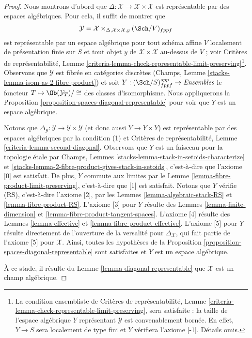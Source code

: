 \begin{proof}
Nous montrons d'abord que $\Delta : \mathcal{X} \to \mathcal{X} \times \mathcal{X}$
est représentable par des espaces algébriques. Pour cela, il suffit de montrer
que
$$
\mathcal{Y} =
\mathcal{X} \times_{\Delta, \mathcal{X} \times \mathcal{X}, y} (\Sch/V)_{fppf}
$$
est représentable par un espace algébrique pour tout schéma affine $V$ localement
de présentation finie sur $S$ et tout objet $y$ de
$\mathcal{X} \times \mathcal{X}$ au-dessus de $V$ ; voir
Critères de représentabilité, Lemme
\ref{criteria-lemma-check-representable-limit-preserving}\footnote{La
condition ensembliste de Critères de représentabilité, Lemme
\ref{criteria-lemma-check-representable-limit-preserving},
sera satisfaite : la taille de l'espace algébrique $Y$ représentant $\mathcal{Y}$ est
convenablement bornée. En effet, $Y \to S$ sera localement de type fini et $Y$
vérifiera l'axiome [-1]. Détails omis.}.
Observons que $\mathcal{Y}$ est fibrée en catégories discrètes
(Champs, Lemme \ref{stacks-lemma-isom-as-2-fibre-product})
et soit $Y : (\Sch/S)_{fppf}^{opp} \to \textit{Ensembles}$ le foncteur
$T \mapsto \Ob(\mathcal{Y}_T)/\cong$ des classes d'isomorphisme.
Nous appliquerons la
Proposition \ref{proposition-spaces-diagonal-representable}
pour voir que $Y$ est un espace algébrique.

\medskip\noindent
Notons que
$\Delta_\mathcal{Y} : \mathcal{Y} \to \mathcal{Y} \times \mathcal{Y}$
(et donc aussi $Y \to Y \times Y$)
est représentable par des espaces algébriques par la condition (1) et
Critères de représentabilité, Lemme \ref{criteria-lemma-second-diagonal}.
Observons que $Y$ est un faisceau pour la topologie \'etale par
Champs, Lemmes \ref{stacks-lemma-stack-in-setoids-characterize} et
\ref{stacks-lemma-2-fibre-product-gives-stack-in-setoids}, c'est-à-dire que
l'axiome [0] est satisfait. De plus, $Y$ commute aux limites par
le Lemme \ref{lemma-fibre-product-limit-preserving}, c'est-à-dire que [1] est satisfait.
Notons que $Y$ vérifie (RS), c'est-à-dire l'axiome [2], par les
Lemmes \ref{lemma-algebraic-stack-RS} et
\ref{lemma-fibre-product-RS}. L'axiome [3] pour $Y$ résulte
des Lemmes \ref{lemma-finite-dimension} et
\ref{lemma-fibre-product-tangent-spaces}.
L'axiome [4] résulte des Lemmes \ref{lemma-effective} et
\ref{lemma-fibre-product-effective}.
L'axiome [5] pour $Y$ résulte directement de l'ouverture de la versalité
pour $\Delta_\mathcal{X}$, qui fait partie de l'axiome [5] pour $\mathcal{X}$.
Ainsi, toutes les hypothèses de la
Proposition \ref{proposition-spaces-diagonal-representable}
sont satisfaites et $Y$ est un espace algébrique.

\medskip\noindent
À ce stade, il résulte du Lemme \ref{lemma-diagonal-representable}
que $\mathcal{X}$ est un champ algébrique.
\end{proof}





